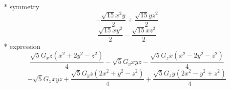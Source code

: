 \documentclass[fleqn,8pt]{jsarticle}
\begin{document}
\noindent\quad ** symmetry
\begin{dmath*}
- \frac{\sqrt{15} x^{2} y}{2} + \frac{\sqrt{15} y z^{2}}{2}
\end{dmath*}
\begin{dmath*}
\frac{\sqrt{15} x y^{2}}{2} - \frac{\sqrt{15} x z^{2}}{2}
\end{dmath*}
\noindent\quad ** expression
\begin{dmath*}
\frac{\sqrt{5} G_{x} z \left(x^{2} + 2 y^{2} - z^{2}\right)}{4} - \sqrt{5} G_{y} x y z - \frac{\sqrt{5} G_{z} x \left(x^{2} - 2 y^{2} - z^{2}\right)}{4}
\end{dmath*}
\begin{dmath*}
- \sqrt{5} G_{x} x y z + \frac{\sqrt{5} G_{y} z \left(2 x^{2} + y^{2} - z^{2}\right)}{4} + \frac{\sqrt{5} G_{z} y \left(2 x^{2} - y^{2} + z^{2}\right)}{4}
\end{dmath*}
\end{document}
